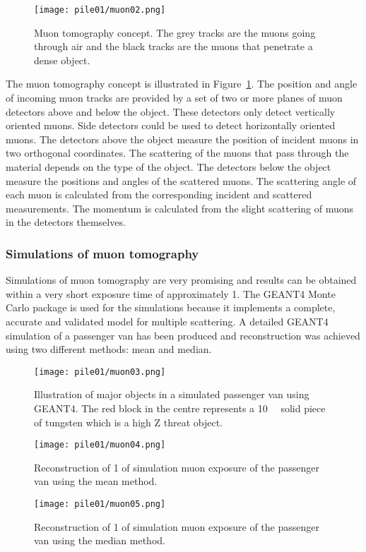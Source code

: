 \documentclass[twoside,titlepage,11pt,twocolumn,a4paper]{article}
\begin{document}
\begin{figure}
  \texttt{[image: pile01/muon02.png]}
  \caption{Muon tomography concept. The grey tracks are the muons
    going through air and the black tracks are the muons that
    penetrate a dense object. \citep{statisticalRec2007}}
  \label{fig:muon02}
\end{figure}

The muon tomography concept is illustrated in
Figure~\ref{fig:muon02}. The position and angle of incoming muon
tracks are provided by a set of two or more planes of muon detectors
above and below the object. These detectors only detect vertically
oriented muons. Side detectors could be used to detect horizontally
oriented muons. The detectors above the object measure the position of
incident muons in two orthogonal coordinates. The scattering of the
muons that pass through the material depends on the type of the
object. The detectors below the object measure the positions and
angles of the scattered muons. The scattering angle of each muon is
calculated from the corresponding incident and scattered
measurements. The momentum is calculated from the slight scattering of
muons in the detectors themselves. \citep{statisticalRec2007}

\subsubsection{Simulations of muon tomography}
Simulations of muon tomography are very promising and results can be
obtained within a very short exposure time of approximately
\unit{1}{\minute}. The GEANT4 Monte Carlo package is used for the
simulations because it implements a complete, accurate and validated
model for multiple scattering. A detailed GEANT4 simulation of a
passenger van has been produced and reconstruction was achieved using
two different methods: mean and median. \citep{statisticalRec2007}

\begin{figure}
  \texttt{[image: pile01/muon03.png]}
  \caption{Illustration of major objects in a simulated passenger van
    using GEANT4. The red block in the centre represents a
    \unit{10}{\cubic{\centi\metre}} solid piece of
    tungsten which is a high Z threat
    object. \citep{statisticalRec2007}}
\end{figure}
\begin{figure}
  \texttt{[image: pile01/muon04.png]}
  \caption{Reconstruction of \unit{1}{\minute} of simulation muon
    exposure of the passenger van using the mean
    method. \citep{statisticalRec2007}}
  \label{fig:muon04}
\end{figure}
\begin{figure}
  \texttt{[image: pile01/muon05.png]}
  \caption{Reconstruction of \unit{1}{\minute} of simulation muon
    exposure of the passenger van using the median
    method. \citep{statisticalRec2007}}
  \label{fig:muon05}
\end{figure}
\end{document}
